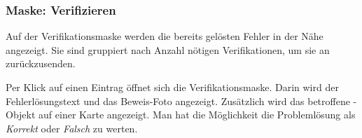 \begin{figure}[H]
\hfill
{}
\end{figure}

\subsubsection{Maske: Verifizieren}
Auf der Verifikationsmaske werden die bereits gelösten Fehler in der Nähe angezeigt.
Sie sind gruppiert nach Anzahl nötigen Verifikationen, um sie an  zurückzusenden.

Per Klick auf einen Eintrag öffnet sich die Verifikationsmaske.
Darin wird der Fehlerlösungstext und das Beweis-Foto angezeigt.
Zusätzlich wird das betroffene -Objekt auf einer Karte angezeigt.
Man hat die Möglichkeit die Problemlösung als \emph{Korrekt} oder \emph{Falsch} zu werten.


